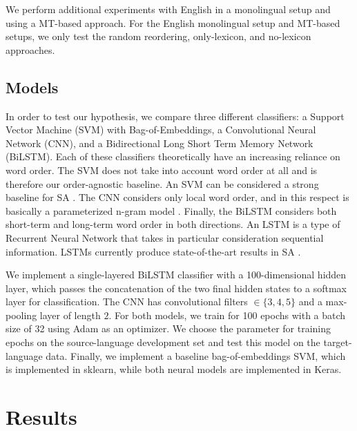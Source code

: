 \documentclass[11pt,a4paper]{article}
\begin{document}
We perform additional experiments with English in a monolingual setup and using a MT-based approach. For the English monolingual setup and MT-based setups, we only test the random reordering, only-lexicon, and no-lexicon approaches.

\subsection{Models}

In order to test our hypothesis, we compare three different classifiers: a Support Vector Machine (SVM) with Bag-of-Embeddings, a Convolutional Neural Network (CNN), and a Bidirectional Long Short Term Memory Network (BiLSTM). Each of these classifiers theoretically have an increasing reliance on word order. The SVM does not take into account word order at all and is therefore our order-agnostic baseline. An SVM can be considered a strong baseline for SA \cite{Kiritchenko2014c}. The CNN considers only local word order, and in this respect is basically a parameterized n-gram model \cite{Santos2014,Severyn2015,Barnes2017}. Finally, the BiLSTM considers both short-term and long-term word order in both directions. An LSTM is a type of Recurrent Neural Network that takes in particular consideration sequential information. LSTMs currently produce state-of-the-art results in SA \cite{Tai2015a,Barnes2017,Howard2018}. 

We implement a single-layered BiLSTM classifier with a 100-dimensional hidden layer, which passes the concatenation of the two final hidden states to a softmax layer for classification. The CNN has convolutional filters $\in \{3,4,5\}$ and a max-pooling layer of length $2$. For both models, we train for 100 epochs with a batch size of 32 using Adam as an optimizer. We choose the parameter for training epochs on the source-language development set and test this model on the target-language data. Finally, we implement a baseline bag-of-embeddings SVM, which is implemented in sklearn, while both neural models are implemented in Keras.

\section{Results}
\end{document}
